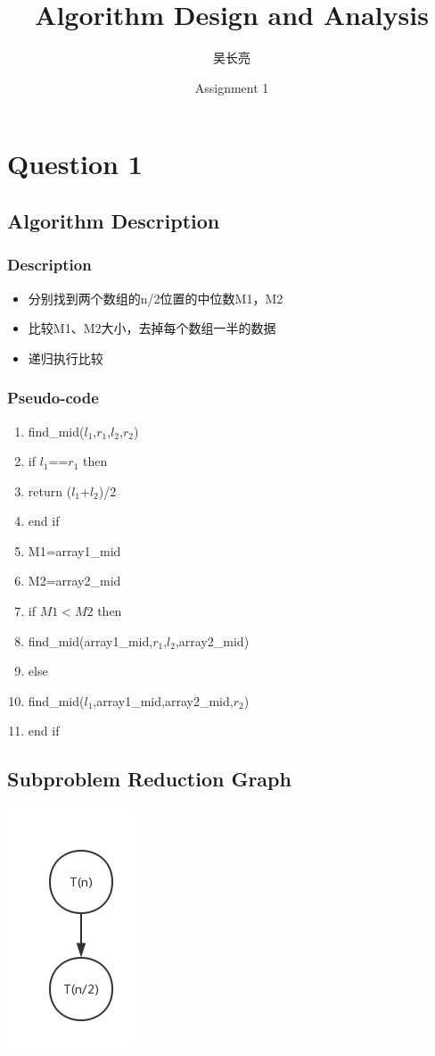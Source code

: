 \documentclass{article}
\title{Algorithm Design and Analysis}
\date{Assignment 1}
\author{吴长亮}
\begin{document}
\maketitle

\section{Question 1}
\subsection{Algorithm Description}
  \subsubsection{Description}

  \begin{itemize}
  \item 分别找到两个数组的n/2位置的中位数M1，M2
  \item 比较M1、M2大小，去掉每个数组一半的数据
  \item 递归执行比较
  \end{itemize}

  \subsubsection{Pseudo-code}

  \begin{enumerate}[1:]
  \item find_mid($l_{1}$,$r_{1}$,$l_{2}$,$r_{2}$)
  \item if $l_{1}$==$r_{1}$ then
  \item   return ($l_{1}$+$l_{2}$)/2
  \item end if
  \item M1=array1_mid
  \item M2=array2_mid
  \item if $M1<M2$ then
  \item   find_mid(array1_mid,$r_{1}$,$l_{2}$,array2_mid)
  \item else
  \item   find_mid($l_{1}$,array1_mid,array2_mid,$r_{2}$)
  \item end if
  \end{enumerate}

\subsection{Subproblem Reduction Graph}
  \centerline{\includegraphics[scale=0.6]{q1.png}}
\end{document}
